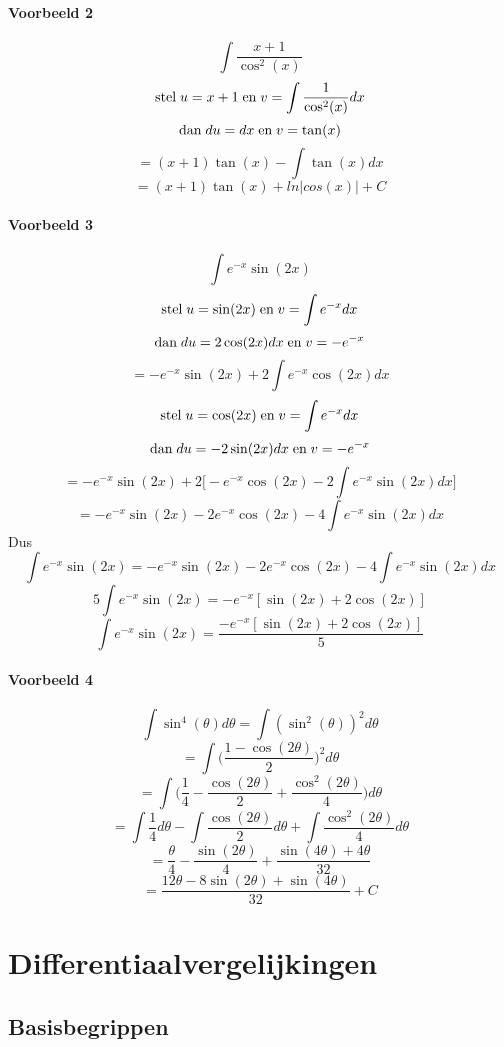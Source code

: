 \documentclass[12pt]{report}
\begin{document}
\subsection{Voorbeeld 2}
$$\int \frac{x + 1}{\cos^2(x)}$$
$$\hbox{stel}\; u = x + 1 \; \hbox{en}\; v = \int \frac{1}{\cos^2(x)}dx$$
$$\hbox{dan}\; du = dx \; \hbox{en}\; v = \tan(x)$$
$$= (x+1)\tan(x) - \int \tan(x)dx$$
$$= (x+1)\tan(x) + ln|cos(x)| + C$$
\subsection{Voorbeeld 3}
$$\int e^{-x}\sin(2x)$$
$$\hbox{stel}\; u = \sin(2x) \; \hbox{en}\; v = \int e^{-x}dx$$
$$\hbox{dan}\; du = 2\cos(2x)dx \; \hbox{en}\; v = -e^{-x}$$
$$= -e^{-x}\sin(2x) + 2 \int e^{-x}\cos(2x) dx$$
$$\hbox{stel}\; u = \cos(2x) \; \hbox{en}\; v = \int e^{-x}dx$$
$$\hbox{dan}\; du = -2\sin(2x)dx \; \hbox{en}\; v = -e^{-x}$$
$$= -e^{-x}\sin(2x) + 2\bigg[-e^{-x}\cos(2x)  - 2\int e^{-x}\sin(2x)dx   \bigg]$$
$$= -e^{-x}\sin(2x) - 2e^{-x}\cos(2x) -  4\int e^{-x}\sin(2x)dx$$
Dus
$$\int e^{-x}\sin(2x) =  -e^{-x}\sin(2x) - 2e^{-x}\cos(2x) -  4\int e^{-x}\sin(2x)dx$$
$$5\int e^{-x}\sin(2x) = -e^{-x}[\sin(2x) + 2\cos(2x)]$$
$$\int e^{-x}\sin(2x) = \frac{-e^{-x}[\sin(2x) + 2\cos(2x)]}{5}$$
\subsection{Voorbeeld 4}
$$\int \sin^4(\theta) d\theta = \int (\sin^2(\theta))^2 d\theta$$
$$= \int \bigg(\frac{1 - \cos(2\theta)}{2}\bigg)^2 d\theta$$
$$= \int \bigg(\frac{1}{4} - \frac{\cos(2\theta)}{2} + \frac{\cos^2(2\theta)}{4} \bigg)d\theta$$
$$= \int \frac{1}{4}d\theta - \int \frac{\cos(2\theta)}{2}d\theta + \int \frac{\cos^2(2\theta)}{4}d\theta$$
$$= \frac{\theta}{4} - \frac{\sin(2\theta)}{4} + \frac{\sin(4\theta) + 4\theta}{32}$$
$$= \frac{12\theta - 8\sin(2\theta) + \sin(4\theta)}{32} + C$$

\part{Differentiaalvergelijkingen}
\chapter{Basisbegrippen}
\end{document}
